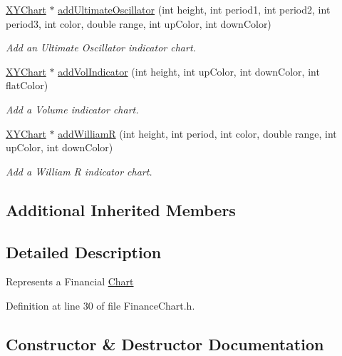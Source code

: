 \begin{DoxyCompactItemize}
\hyperlink{class_x_y_chart}{X\+Y\+Chart} $\ast$ \hyperlink{class_finance_chart_aa7a2bc1fab9c1ec538ff293c107d6cc4}{add\+Ultimate\+Oscillator} (int height, int period1, int period2, int period3, int color, double range, int up\+Color, int down\+Color)
\begin{DoxyCompactList}\small\item\em Add an Ultimate Oscillator indicator chart. \end{DoxyCompactList}\item 
\hyperlink{class_x_y_chart}{X\+Y\+Chart} $\ast$ \hyperlink{class_finance_chart_a51ceb77140f73f49707d526dafe643fe}{add\+Vol\+Indicator} (int height, int up\+Color, int down\+Color, int flat\+Color)
\begin{DoxyCompactList}\small\item\em Add a Volume indicator chart. \end{DoxyCompactList}\item 
\hyperlink{class_x_y_chart}{X\+Y\+Chart} $\ast$ \hyperlink{class_finance_chart_aa0f6a518a8fb451cc645f10e3e947ff0}{add\+WilliamR} (int height, int period, int color, double range, int up\+Color, int down\+Color)
\begin{DoxyCompactList}\small\item\em Add a William R indicator chart. \end{DoxyCompactList}\end{DoxyCompactItemize}
\subsection*{Additional Inherited Members}


\subsection{Detailed Description}
Represents a Financial \hyperlink{namespace_chart}{Chart} 



Definition at line 30 of file Finance\+Chart.\+h.



\subsection{Constructor \& Destructor Documentation}
\mbox{\label{class_finance_chart_a044a1d55c37501ea29ed2b5916faf0e1}} 
